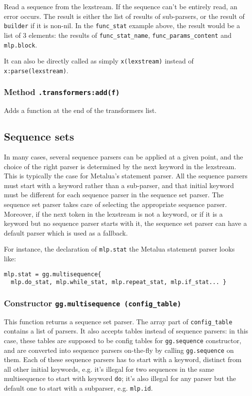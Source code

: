 Read a sequence from the lexstream. If the sequence can't be entirely
read, an error occurs. The result is either the list of results of
sub-parsers, or the result of \verb|builder| if it is non-nil. In the
\verb|func_stat| example above, the result would be a list of 3
elements: the results of \verb|func_stat_name|,
\verb|func_params_content| and \verb|mlp.block|.

It can also be directly called as simply \verb|x(lexstream)| instead of
\verb|x:parse(lexstream)|.

\subsubsection{Method {\tt .transformers:add(f)}}
Adds a function at the end of the transformers list.

\subsection{Sequence sets}

In many cases, several sequence parsers can be applied at a given
point, and the choice of the right parser is determined by the next
keyword in the lexstream. This is typically the case for Metalua's
statement parser. All the sequence parsers must start with a keyword
rather than a sub-parser, and that initial keyword must be different
for each sequence parser in the sequence set parser. The sequence set
parser takes care of selecting the appropriate sequence
parser. Moreover, if the next token in the lexstream is not a keyword, or
if it is a keyword but no sequence parser starts with it, the sequence
set parser can have a default parser which is used as a fallback.

For instance, the declaration of \verb|mlp.stat| the Metalua statement
parser looks like:

\begin{verbatim}
mlp.stat = gg.multisequence{
  mlp.do_stat, mlp.while_stat, mlp.repeat_stat, mlp.if_stat... }
\end{verbatim}

\subsubsection{Constructor {\tt gg.multisequence (config\_table)}}


This function returns a sequence set parser. The array part of
\verb|config_table| contains a list of parsers. It also accepts tables
instead of sequence parsers: in this case, these tables are supposed
to be config tables for \verb|gg.sequence| constructor, and are
converted into sequence parsers on-the-fly by calling
\verb|gg.sequence| on them. Each of these sequence parsers has to
start with a keyword, distinct from all other initial keywords,
e.g. it's illegal for two sequences in the same multisequence to start
with keyword {\tt do}; it's also illegal for any parser but the
default one to start with a subparser, e.g. {\tt mlp.id}.

